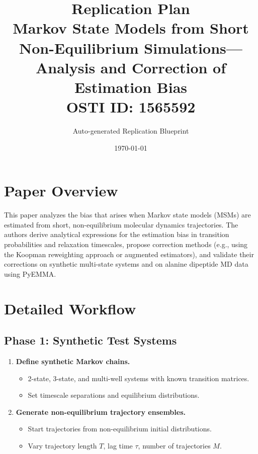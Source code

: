 \documentclass[11pt,a4paper]{article}
\title{\textbf{Replication Plan}\\[0.5em]
\large Markov State Models from Short Non-Equilibrium Simulations---Analysis and Correction of Estimation Bias\\[0.3em]
\normalsize OSTI ID: 1565592}
\author{Auto-generated Replication Blueprint}
\date{\today}
\begin{document}
\maketitle
\tableofcontents
\newpage

\section{Paper Overview}
This paper analyzes the bias that arises when Markov state models (MSMs) are estimated from short, non-equilibrium molecular dynamics trajectories. The authors derive analytical expressions for the estimation bias in transition probabilities and relaxation timescales, propose correction methods (e.g., using the Koopman reweighting approach or augmented estimators), and validate their corrections on synthetic multi-state systems and on alanine dipeptide MD data using PyEMMA.

\section{Detailed Workflow}

\subsection{Phase 1: Synthetic Test Systems}
\begin{enumerate}[label=\textbf{1.\arabic*}]
  \item \textbf{Define synthetic Markov chains.}
    \begin{itemize}
      \item 2-state, 3-state, and multi-well systems with known transition matrices.
      \item Set timescale separations and equilibrium distributions.
    \end{itemize}
  \item \textbf{Generate non-equilibrium trajectory ensembles.}
    \begin{itemize}
      \item Start trajectories from non-equilibrium initial distributions.
      \item Vary trajectory length $T$, lag time $\tau$, number of trajectories $M$.
    \end{itemize}
\end{enumerate}
\end{document}

